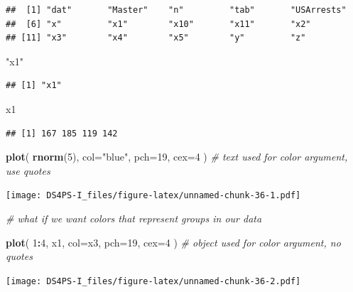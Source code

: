 \documentclass[]{book}
\newenvironment{Shaded}{\begin{snugshade}}{\end{snugshade}}
\newcommand{\CommentTok}[1]{\textcolor[rgb]{0.56,0.35,0.01}{\textit{#1}}}
\newcommand{\DataTypeTok}[1]{\textcolor[rgb]{0.13,0.29,0.53}{#1}}
\newcommand{\DecValTok}[1]{\textcolor[rgb]{0.00,0.00,0.81}{#1}}
\newcommand{\KeywordTok}[1]{\textcolor[rgb]{0.13,0.29,0.53}{\textbf{#1}}}
\newcommand{\NormalTok}[1]{#1}
\newcommand{\OperatorTok}[1]{\textcolor[rgb]{0.81,0.36,0.00}{\textbf{#1}}}
\newcommand{\StringTok}[1]{\textcolor[rgb]{0.31,0.60,0.02}{#1}}
\theoremstyle{definition}
\theoremstyle{definition}
\theoremstyle{definition}
\theoremstyle{remark}
\begin{document}
\begin{verbatim}
##  [1] "dat"       "Master"    "n"         "tab"       "USArrests"
##  [6] "x"         "x1"        "x10"       "x11"       "x2"       
## [11] "x3"        "x4"        "x5"        "y"         "z"
\end{verbatim}

\begin{Shaded}
\begin{Highlighting}[]
\StringTok{"x1"}
\end{Highlighting}
\end{Shaded}

\begin{verbatim}
## [1] "x1"
\end{verbatim}

\begin{Shaded}
\begin{Highlighting}[]
\NormalTok{x1}
\end{Highlighting}
\end{Shaded}

\begin{verbatim}
## [1] 167 185 119 142
\end{verbatim}

\begin{Shaded}
\begin{Highlighting}[]
\KeywordTok{plot}\NormalTok{( }\KeywordTok{rnorm}\NormalTok{(}\DecValTok{5}\NormalTok{), }\DataTypeTok{col=}\StringTok{"blue"}\NormalTok{, }\DataTypeTok{pch=}\DecValTok{19}\NormalTok{, }\DataTypeTok{cex=}\DecValTok{4}\NormalTok{ )   }\CommentTok{# text used for color argument, use quotes}
\end{Highlighting}
\end{Shaded}

\texttt{[image: DS4PS-I\_files/figure-latex/unnamed-chunk-36-1.pdf]}

\begin{Shaded}
\begin{Highlighting}[]
\CommentTok{# what if we want colors that represent groups in our data}

\KeywordTok{plot}\NormalTok{( }\DecValTok{1}\OperatorTok{:}\DecValTok{4}\NormalTok{, x1, }\DataTypeTok{col=}\NormalTok{x3, }\DataTypeTok{pch=}\DecValTok{19}\NormalTok{, }\DataTypeTok{cex=}\DecValTok{4}\NormalTok{ )       }\CommentTok{# object used for color argument, no quotes}
\end{Highlighting}
\end{Shaded}

\texttt{[image: DS4PS-I\_files/figure-latex/unnamed-chunk-36-2.pdf]}
\end{document}
